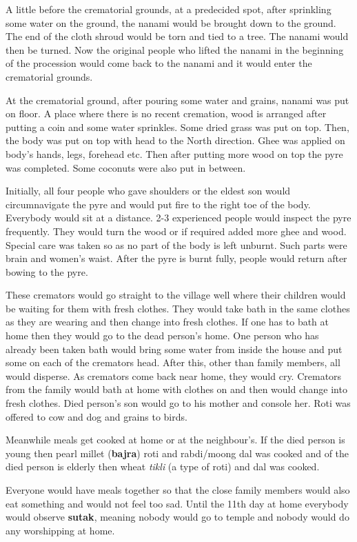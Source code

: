 A little before the crematorial grounds, at a predecided spot, after sprinkling
some water on the ground, the nanami would be brought down to the ground. The
end of the cloth shroud would be torn and tied to a tree. The nanami would then
be turned. Now the original people who lifted the nanami in the beginning of the
procession would come back to the nanami and it would enter the crematorial
grounds.

At the crematorial ground, after pouring some water and grains, nanami was put
on floor. A place where there is no recent cremation, wood is arranged after
putting a coin and some water sprinkles. Some dried grass was put on top. Then,
the body was put on top with head to the North direction. Ghee was applied on
body's hands, legs, forehead etc. Then after putting more wood on top the pyre
was completed. Some coconuts were also put in between.

Initially, all four people who gave shoulders or the eldest son would
circumnavigate the pyre and would put fire to the right toe of the body.
Everybody would sit at a distance. 2-3 experienced people would inspect the
pyre frequently. They would turn the wood or if required added more ghee and
wood. Special care was taken so as no part of the body is left unburnt. Such
parts were brain and women's waist. After the pyre is burnt fully, people would
return after bowing to the pyre.

These cremators would go straight to the village well where their children
would be waiting for them with fresh clothes. They would take bath in the same
clothes as they are wearing and then change into fresh clothes. If one has to
bath at home then they would go to the dead person's home. One person who has
already been taken bath would bring some water from inside the house and put
some on each of the cremators head. After this, other than family members, all
would disperse. As cremators come back near home, they would cry. Cremators
from the family would bath at home with clothes on and then would change into
fresh clothes. Died person's son would go to his mother and console her. Roti
was offered to cow and dog and grains to birds.

Meanwhile meals get cooked at home or at the neighbour's. If the died person is
young then pearl millet (\textbf{bajra}) roti and rabdi/moong dal was cooked
and of the died person is elderly then wheat \textit{tikli} (a type of roti)
and dal was cooked.

Everyone would have meals together so that the close family members would also
eat something and would not feel too sad. Until the 11th day at home everybody
would observe \textbf{sutak}, meaning nobody would go to temple and nobody
would do any worshipping at home. 

